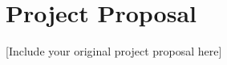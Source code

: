 \documentclass[12pt,a4paper]{report}
\begin{document}


\printindex

\chapter*{Project Proposal}
[Include your original project proposal here]
\end{document}
